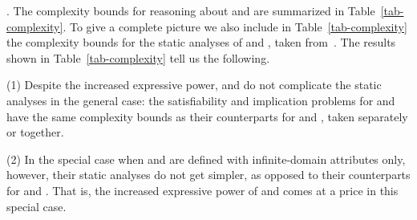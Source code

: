 . The complexity bounds for reasoning about
\pCFDs and \pCINDs are summarized in Table~\ref{tab-complexity}.
To give a complete picture we also include
in Table~\ref{tab-complexity} the complexity bounds for
the static analyses of
\CFDs and \CINDs, taken from~\cite{CFDs,tcs-CINDs}. The results shown in
Table~\ref{tab-complexity} tell us the following.

\sstab
(1) Despite the increased expressive
power, \pCFDs and \pCINDs do not complicate the static analyses in the general case: the
satisfiability and implication problems for \pCFDs and \pCINDs have
the same complexity bounds as their
counterparts for \CFDs and \CINDs, taken separately or together.

\sstab
(2) In the special case when \pCFDs and \pCINDs are defined
with infinite-domain attributes only, however, their
static analyses do not get simpler, as opposed to their counterparts for
\CFDs and \CINDs. That is, the increased expressive power of \pCFDs and \pCINDs comes at a price in this special case.
